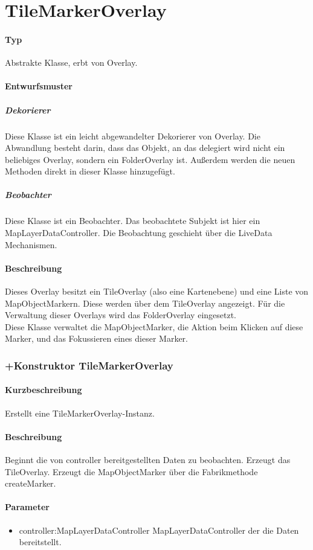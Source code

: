 \section{TileMarkerOverlay}
\paragraph*{Typ} 
Abstrakte Klasse, erbt von Overlay.
\paragraph*{Entwurfsmuster}
\subparagraph*{Dekorierer}
Diese Klasse ist ein leicht abgewandelter Dekorierer von Overlay.
Die Abwandlung besteht darin, dass das Objekt, an das delegiert wird nicht ein
beliebiges Overlay, sondern ein FolderOverlay ist. Außerdem werden die neuen 
Methoden direkt in dieser Klasse hinzugefügt.\\
\subparagraph*{Beobachter}
Diese Klasse ist ein Beobachter. Das beobachtete Subjekt ist hier ein MapLayerDataController.
Die Beobachtung geschieht über die LiveData Mechanismen.
\paragraph*{Beschreibung}
Dieses Overlay besitzt ein TileOverlay (also eine Kartenebene) und eine 
Liste von MapObjectMarkern. Diese werden über dem TileOverlay angezeigt.
Für die Verwaltung dieser Overlays wird das FolderOverlay eingesetzt.\\
Diese Klasse verwaltet die MapObjectMarker, die Aktion beim Klicken auf diese Marker, 
und das Fokussieren eines dieser Marker.

\subsubsection{+Konstruktor TileMarkerOverlay}%
\paragraph*{Kurzbeschreibung}
Erstellt eine TileMarkerOverlay-Instanz.
\paragraph*{Beschreibung}
Beginnt die von controller bereitgestellten Daten zu beobachten. Erzeugt das TileOverlay.
Erzeugt die MapObjectMarker über die Fabrikmethode createMarker.
\paragraph*{Parameter}
\begin{itemize}
    \item controller:MapLayerDataController MapLayerDataController der die Daten bereitstellt.
\end{itemize}

